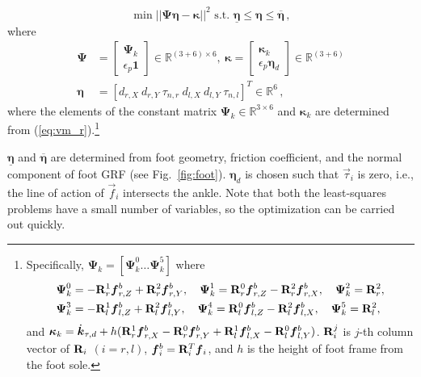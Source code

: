 \documentclass{llncs}
\newcommand{\veta} {\boldsymbol{\eta}}
\newcommand{\vkappa} {\boldsymbol{\kappa}}
\newcommand{\mPsi} {\boldsymbol{\Psi}}
\newcommand {\mat}[1] {{\bf #1}}
\newcommand{\mR} {\mat{R}}
\newcommand{\real} {\mathbb{R}}
\newcommand{\eye} {\mathbf{1}}
\newcommand{\vtau}{\vec{\tau}}
\newcommand{\vf}{\vec{f}}
\newcommand{\vdk} {\dot{\vec{k}}}
\begin{document}
\begin{equation}
	\min || \mPsi \veta - \vkappa ||^2  \text{~s.t.~} \underline{\veta} \le \veta \le \overline{\veta}  \, ,\label{eq:opt_m}
\end{equation}
where
\begin{align}\label{eq:Psi}
	\mPsi &= \begin{bmatrix} \mPsi_k \\	\epsilon_p \eye \end{bmatrix}\in \real^{(3+6)\times 6}, ~	
	\vkappa = \begin{bmatrix} \vkappa_k \\ \epsilon_p \veta_d \end{bmatrix}\in \real^{(3+6)} \\
	\veta &=[ d_{r,X}~ d_{r,Y}~ \tau_{n,r} ~ d_{l,X} ~ d_{l,Y} ~ \tau_{n,l} ]^T\in \real^{6}  \, ,
\end{align}
where the elements of the constant matrix $\mPsi_k\in \real^{3\times 6}$ and $\vkappa_k$ are determined
from (\ref{eq:vm_r}).\footnote{Specifically, $\mPsi_k = [\mPsi_k^0 \ldots \mPsi_k^5]$ where
\begin{align*}
\mPsi_k^0 &= -\mR_{r}^1\vf^b_{r,Z} + \mR_{r}^2\vf^b_{r,Y},\quad \mPsi_k^1 = \mR_{r}^0\vf^b_{r,Z} - \mR_{r}^2\vf^b_{r,X},\quad \mPsi_k^2 = \mR_{r}^2,\\
\mPsi_k^3 &= -\mR_{l}^1\vf^b_{l,Z} + \mR_{l}^2\vf^b_{l,Y},\quad \mPsi_k^4 = \mR_{l}^0\vf^b_{l,Z} - \mR_{l}^2\vf^b_{l,X},\quad \mPsi_k^5 = \mR_{l}^2,
\end{align*}
and $\vkappa_k = \vdk_{\tau,d} + h ( \mR_{r}^1\vf^b_{r,X} - \mR_{r}^0\vf^b_{r,Y} + \mR_{l}^1\vf^b_{l,X} - \mR_{l}^0\vf^b_{l,Y} )$.
$\mR_{i}^j$ is $j$-th column vector of $\mR_i$ $(i=r,l)$, $\vf^b_i=\mR_i^T\vf_i$, and $h$ is the height of foot frame from the foot sole.
}

$\underline{\veta}$ and $\overline{\veta}$ are determined from foot geometry,
friction coefficient, and the normal component of foot GRF (see Fig.~\ref{fig:foot}).
$\veta_d$ is chosen such that $\vtau_i$ is zero, i.e., the line
of action of $\vf_i$ intersects the ankle. %
Note that both the least-squares problems have a small number of variables, so
the optimization can be carried out quickly.
\end{document}

